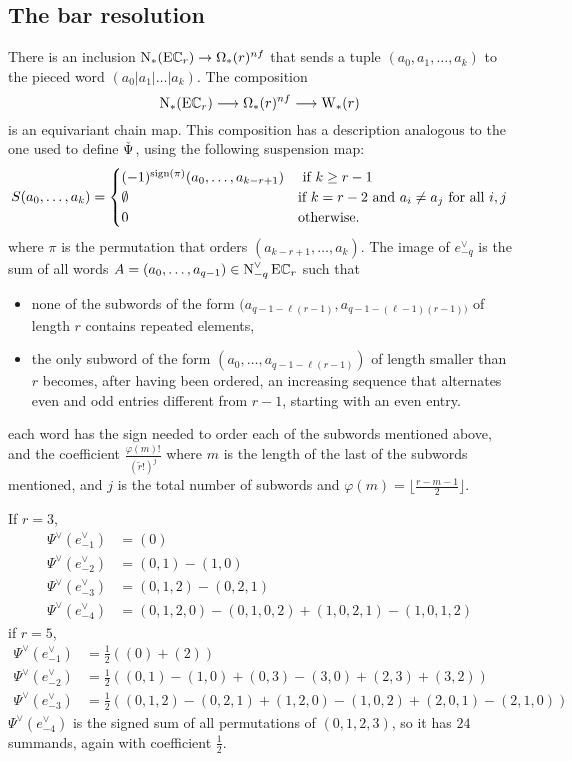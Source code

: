 
\subsection{The bar resolution}\label{ss:milnor}
There is an inclusion $\chains(\EC_r)\to \Omega_*(r)^{\nf}$ that sends a tuple $(a_0,a_1,\ldots,a_k)$ to the pieced word $(a_0|a_1|\ldots|a_k)$. The composition
\[
\chains(\EC_r)\lra \Omega_*(r)^{\nf}\lra \rW(r)
\]
is an equivariant chain map. This composition has a description analogous to the one used to define $\Psiom$, using the following suspension map:
\[
S(a_0,\ldots,a_k) = \begin{cases}
	(-1)^{\sign{\perm}} (a_{0},\ldots,a_{k-r+1}) & \text{ if $k\geq r-1$} \\
	\emptyset & \text{if $k = r-2$ and $a_i\neq a_j$ for all $i,j$} \\
	0 & \text{otherwise.}
\end{cases}
\]
where $\pi$ is the permutation that orders $(a_{k-r+1},\ldots,a_{k})$. The image of $e_{-q}^{\vee}$ is the sum of all words $A = (a_0,\ldots,a_{q-1})\in \cochains[-q] \EC_r$ such that
\begin{itemize}
\item none of the subwords of the form $(a_{q-1-\ell(r-1)},a_{q-1-(\ell-1)(r-1))}$ of length $r$ contains repeated elements,
\item the only subword of the form $(a_0,\ldots,a_{q-1-\ell(r-1)})$ of length smaller than $r$ becomes, after having been ordered, an increasing sequence that alternates even and odd entries different from $r-1$, starting with an even entry. 
\end{itemize}
each word has the sign needed to order each of the subwords mentioned above, and the coefficient $\frac{\varphi(m)!}{(\tilde{r}!)^j}$ where $m$ is the length of the last of the subwords mentioned, and $j$ is the total number of subwords and $\varphi(m) = \lfloor\frac{r-m-1}{2}\rfloor$.
\begin{example} If $r=3$,
\begin{align*}
	\Psi^\vee(e_{-1}^\vee) &= (0)
	\\
	\Psi^\vee(e_{-2}^{\vee}) &= (0,1)-(1,0)
	\\
	\Psi^\vee(e_{-3}^{\vee}) &= (0,1,2) - (0,2,1)
\\
	\Psi^\vee(e_{-4}^{\vee}) &= (0,1,2,0) - (0,1,0,2) + (1,0,2,1) - (1,0,1,2)
\end{align*}
if $r= 5$,
\begin{align*}
	\Psi^\vee(e^\vee_{-1}) &= \frac{1}{2}\left((0) + (2)\right) 
	\\
	\Psi^\vee(e^\vee_{-2}) &= \frac{1}{2}\left((0,1) - (1,0) + (0,3) - (3,0) + (2,3) + (3,2)\right) 
	\\
	\Psi^\vee(e^\vee_{-3}) &= \frac{1}{2}\left((0,1,2) -(0,2,1) + (1,2,0) - (1,0,2) + (2,0,1) - (2,1,0)\right)
\end{align*}
$\Psi^\vee(e^\vee_{-4})$ is the signed sum of all permutations of $(0,1,2,3)$, so it has $24$ summands, again with coefficient $\frac{1}{2}$.
\end{example}

